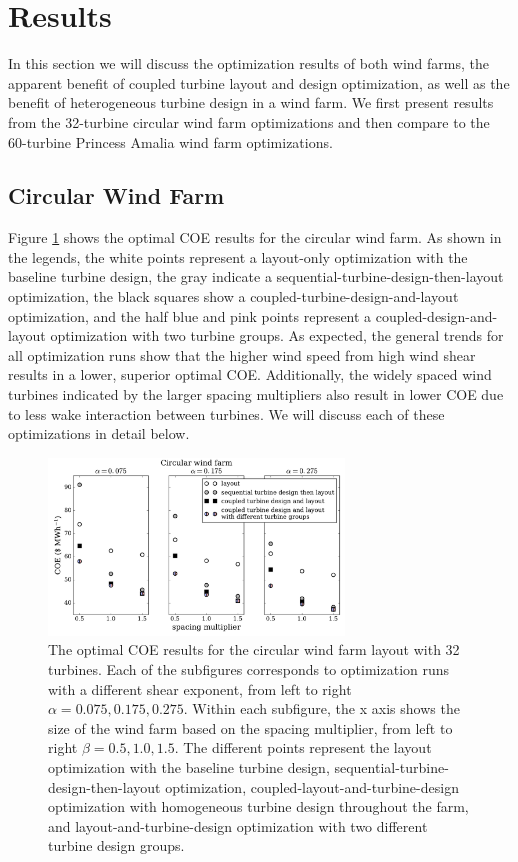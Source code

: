 \documentclass[WESD, manuscript]{copernicus}
\begin{document}
\section{Results}
\newcommand\myeq{\mkern1.5mu{=}\mkern1.5mu}


In this section we will discuss the optimization results of both wind farms, the apparent benefit of coupled turbine layout and design optimization, as well as the benefit of heterogeneous turbine design in a wind farm.
We first present results from the 32-turbine circular wind farm optimizations and then compare to the 60-turbine Princess Amalia wind farm optimizations. 


\subsection{Circular Wind Farm}

Figure \ref{circular_results} shows the optimal COE results for the circular wind farm. As shown in the legends, the white points represent a layout-only optimization with the baseline turbine design, the gray indicate a sequential-turbine-design-then-layout optimization, the black squares show a coupled-turbine-design-and-layout optimization, and the half blue and pink points represent a coupled-design-and-layout optimization with two turbine groups.  As expected, the general trends for all optimization runs show that the higher wind speed from high wind shear results in a lower, superior optimal COE. Additionally, the widely spaced wind turbines indicated by the larger spacing multipliers also result in lower COE due to less wake interaction between turbines. We will discuss each of these optimizations in detail below.


\begin{figure}[htbp]
  \centering
  \includegraphics[width=0.7\textwidth]{Figures/circular_results1.pdf}
  \caption{\label{circular_results} The optimal COE results for the circular wind farm layout with 32 turbines. Each of the subfigures corresponds to optimization runs with a different shear exponent, from left to right $\alpha=0.075,0.175,0.275$. Within each subfigure, the x axis shows the size of the wind farm based on the spacing multiplier, from left to right $\beta=0.5,1.0,1.5$. The different points represent the layout optimization with the baseline turbine design, sequential-turbine-design-then-layout optimization, coupled-layout-and-turbine-design optimization with homogeneous turbine design throughout the farm, and layout-and-turbine-design optimization with two different turbine design groups.}
\end{figure}
\end{document}

